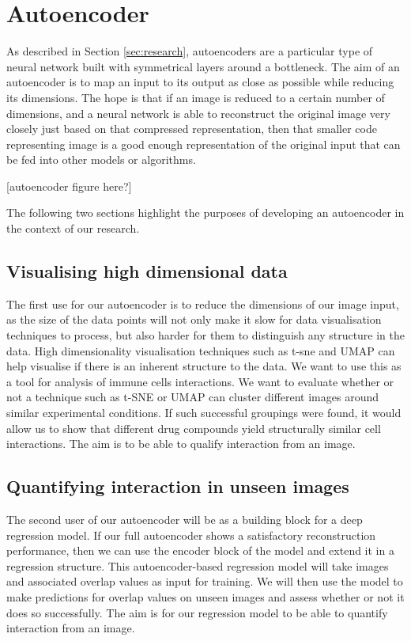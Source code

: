 \section{Autoencoder}

As described in Section \ref{sec:research}, autoencoders are a particular type of neural network built with symmetrical layers around a bottleneck. The aim of an autoencoder is to map an input to its output as close as possible while reducing its dimensions. The hope is that if an image is reduced to a certain number of dimensions, and a neural network is able to reconstruct the original image very closely just based on that compressed representation, then that smaller code representing image is a good enough representation of the original input that can be fed into other models or algorithms.

[autoencoder figure here?]

The following two sections highlight the purposes of developing an autoencoder in the context of our research.

\subsection{Visualising high dimensional data}

The first use for our autoencoder is to reduce the dimensions of our image input, as the size of the data points will not only make it slow for data visualisation techniques to process, but also harder for them to distinguish any structure in the data. High dimensionality visualisation techniques such as t-sne and UMAP can help visualise if there is an inherent structure to the data. We want to use this as a tool for analysis of immune cells interactions. We want to evaluate whether or not a technique such as t-SNE or UMAP can cluster different images around similar experimental conditions. If such successful groupings were found, it would allow us to show that different drug compounds yield structurally similar cell interactions. The aim is to be able to qualify interaction from an image.

\subsection{Quantifying interaction in unseen images}

The second user of our autoencoder will be as a building block for a deep regression model. If our full autoencoder shows a satisfactory reconstruction performance, then we can use the encoder block of the model and extend it in a regression structure. This autoencoder-based regression model will take images and associated overlap values as input for training. We will then use the model to make predictions for overlap values on unseen images and assess whether or not it does so successfully. The aim is for our regression model to be able to quantify interaction from an image.
